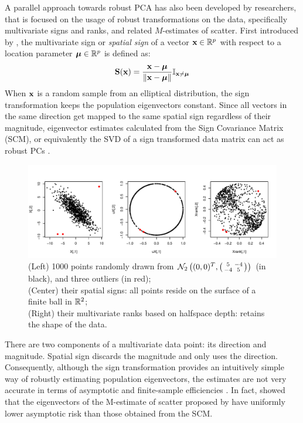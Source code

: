 A parallel approach towards robust PCA has also been developed by researchers, that is focused on the usage of robust transformations on the data, specifically multivariate signs and ranks, and related $M$-estimates of scatter. First introduced by \cite{MottonenOja95}, the multivariate sign or \textit{spatial sign} of a vector ${\bf{x}} \in {\mathbb{R}}^p$ with respect to a location parameter ${\boldsymbol{\mu}} \in {\mathbb{R}}^p$ is defined as:
%
$$
{\mathbf{S}} ({\bf{x}}) = \frac{{\bf{x}}  - {\boldsymbol{\mu}} }{\| {\bf{x}} - {\boldsymbol{\mu}}\|} {\mathbb{I}}_{{\bf{x}} \neq {\boldsymbol{\mu}}}
$$
%
When ${\bf{x}}$ is a random sample from an elliptical distribution, the sign transformation keeps the population eigenvectors constant. Since all vectors in the same direction get mapped to the same spatial sign regardless of their magnitude, eigenvector estimates calculated from the Sign Covariance Matrix (SCM), or equivalently the SVD of a sign transformed data matrix can act as robust PCs \citep{LocantoreEtal99,visuri00}.

\begin{figure}[t]
\centering
\includegraphics[width=\textwidth]{allthree}
	\caption{(Left) 1000 points randomly drawn from $\mathcal N_2\left((0,0)^T, \left(\protect\begin{smallmatrix} 5 & -4 \\ -4 & 5 \protect\end{smallmatrix}\right)\right) $ (in black), and three outliers (in red);\\
(Center) their spatial signs: all points reside on the surface of a finite ball in ${\mathbb{R}}^2$;\\
(Right) their multivariate ranks based on halfspace depth: retains the shape of the data.}
	\label{fig1:allthree}
\end{figure}

There are two components of a multivariate data point: its direction and magnitude. Spatial sign discards the magnitude and only uses the direction. Consequently, although the sign transformation provides an intuitively simple way of robustly estimating population eigenvectors, the estimates are not very accurate in terms of asymptotic and finite-sample efficiencies \citep{Majumdar15}. In fact, \cite{magyar14} showed that the eigenvectors of the M-estimate of scatter proposed by \cite{tyler87} have uniformly lower asymptotic risk than those obtained from the SCM.


